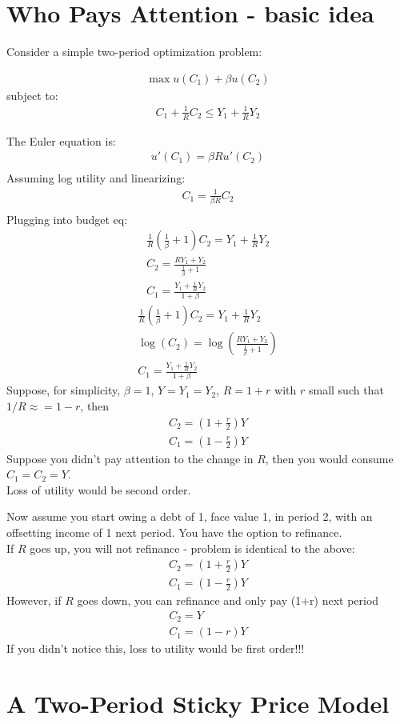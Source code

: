 \documentclass[12pt,pdftex,letterpaper]{article}
\begin{document}
	
\section{Who Pays Attention - basic idea}

Consider a simple two-period optimization problem:

\begin{align}
\max u(C_1) + \beta u(C_2)
\end{align}
subject to:
\begin{align}
C_1 + \frac{1}{R} C_2 \leq Y_1 + \frac{1}{R} Y_2
\end{align}

The Euler equation is:
\begin{align}
u'(C_1) = \beta R u'(C_2) \\
\end{align}
Assuming log utility and linearizing:
\begin{align}
C_1 = \frac{1}{\beta R} C_2 \\
\end{align}
Plugging into budget eq:
\begin{align}
\frac{1}{R}(\frac{1}{\beta} + 1 )C_2 = Y_1 + \frac{1}{R} Y_2 \\
C_2 = \frac{RY_1 +  Y_2}{\frac{1}{\beta} + 1 } \\
C_1 = \frac{Y_1 + \frac{1}{R} Y_2}{1 + \beta }
\end{align}
\begin{align}
\frac{1}{R}(\frac{1}{\beta} + 1 )C_2 = Y_1 + \frac{1}{R} Y_2 \\
\log(C_2) = \log( \frac{RY_1 +  Y_2}{\frac{1}{\beta} + 1 } ) \\
C_1 = \frac{Y_1 + \frac{1}{R} Y_2}{1 + \beta }
\end{align}
Suppose, for simplicity, $\beta = 1$, $Y=Y_1=Y_2$, $R= 1+r$ with $r$ small such that $1/R \approx = 1-r$, then
\begin{align}
C_2 = (1+\frac{r}{2}) Y \\
C_1 = (1-\frac{r}{2 }) Y
\end{align}
Suppose you didn't pay attention to the change in $R$, then you would consume $C_1=C_2=Y$.\\
Loss of utility would be second order.

\newpage

Now assume you start owing a debt of 1, face value 1, in period 2, with an offsetting income of 1 next period. You have the option to refinance.\\
If $R$ goes up, you will not refinance - problem is identical to the above:
 \begin{align}
 C_2 = (1+\frac{r}{2}) Y \\
 C_1 = (1-\frac{r}{2 }) Y
 \end{align}
However, if $R$ goes down, you can refinance and only pay (1+r) next period
 \begin{align}
C_2 =  Y \\
C_1 = (1-r) Y
\end{align}
If you didn't notice this, loss to utility would be first order!!!

\section{A Two-Period Sticky Price Model}
\end{document}
